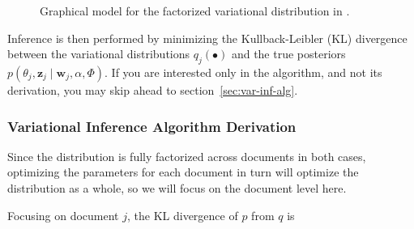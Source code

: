 \documentclass[11pt]{article}
\begin{document}
\begin{figure}[h]
  \begin{center}
  \end{center}
  \caption{Graphical model for the factorized variational distribution in
  \cite{Blei:2003:LDA}.}
  \label{fig:factdist}
\end{figure}

Inference is then performed by minimizing the Kullback-Leibler (KL)
divergence between the variational distributions $q_j(\bullet)$ and the
true posteriors $p(\theta_j, \mathbf{z}_j \mid \mathbf{w}_j, \alpha,
\Phi)$. If you are interested only in the algorithm, and not its
derivation, you may skip ahead to section~\ref{sec:var-inf-alg}.

\subsubsection{Variational Inference Algorithm Derivation}
\label{sec:var-inf-derivation}
Since the distribution is fully factorized across documents in both
cases, optimizing the parameters for each document in turn will optimize
the distribution as a whole, so we will focus on the document level here.

Focusing on document $j$, the KL divergence of $p$ from $q$ is
\end{document}
